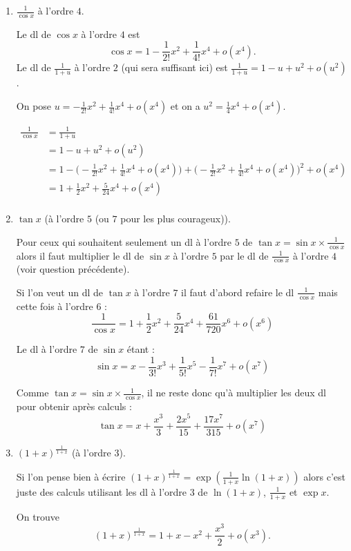 \documentclass[11pt,a4paper]{article}
\begin{document}
\begin{enumerate}
  \item $\displaystyle{\frac{1}{\cos x}}$ à l'ordre $4$.

Le dl de $\cos x$ à l'ordre $4$ est
$$\cos x = 1 - \frac{1}{2!} x^2 + \frac{1}{4!}x^4 + o(x^4).$$
Le dl de $\frac{1}{1+u}$ à l'ordre $2$ (qui sera suffisant ici) est
$\frac{1}{1+u}=1-u+u^2+o(u^2)$.

On pose $u=- \frac{1}{2!} x^2 + \frac{1}{4!}x^4 + o(x^4)$ et on a $u^2 = \frac14 x^4 + o(x^4)$.

\begin{align*}
\frac{1}{\cos x}
  & =  \frac{1}{1+u} \\
  & =  1-u+u^2+o(u^2) \\
  & = 1 -\big(- \frac{1}{2!} x^2 + \frac{1}{4!}x^4 + o(x^4)\big)+\big(- \frac{1}{2!} x^2 + \frac{1}{4!}x^4 + o(x^4)\big)^2 +o(x^4)  \\
  & = 1+\frac{1}{2}x^2+\frac{5}{24}x^4 + o(x^4) \\
\end{align*}


  \item $\tan x$ (à l'ordre $5$ (ou $7$ pour les plus courageux)).

Pour ceux qui souhaitent seulement un dl à l'ordre $5$ de $\tan x =\sin x \times \frac{1}{\cos x}$ alors
il faut multiplier le dl de $\sin x$ à l'ordre $5$ par le dl de $\frac{1}{\cos x}$ à l'ordre $4$ (voir question précédente).


Si l'on veut un dl de $\tan x$ à l'ordre $7$ il faut d'abord refaire le dl $\frac{1}{\cos x}$ mais cette fois à l'ordre $6$ :
$$\frac{1}{\cos x}=1+\frac{1}{2}x^2+\frac{5}{24}x^4 +\frac{61}{720}x^6 + o(x^6)$$

Le dl à l'ordre $7$ de $\sin x$ étant :
$$\sin x = x -\frac{1}{3!}x^3 +\frac{1}{5!}x^5 - \frac{1}{7!}x^7 +o(x^7)$$

Comme  $\tan x = \sin x \times \frac{1}{\cos x}$, il ne reste donc qu'à multiplier les deux dl
pour obtenir après calculs :
$$\tan x = x + \frac{x^3}{3} + \frac{2x^5}{15} + \frac{17x^7}{315} + o(x^7)$$



  \item $(1+x)^{\frac{1}{1+x}}$ (à l'ordre $3$).

Si l'on pense bien à écrire $(1+x)^{\frac{1}{1+x}}= \exp\left( \frac{1}{1+x} \ln(1+x) \right)$
alors c'est juste des calculs utilisant les dl à l'ordre $3$ de $\ln(1+x)$, $\frac{1}{1+x}$ et 
$\exp x$.

On trouve 
$$(1+x)^{\frac{1}{1+x}} = 1+x-x^2 + \frac{x^3}{2} + o(x^3).$$



\end{enumerate}
\end{document}
